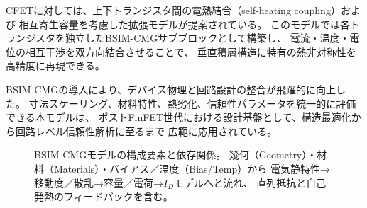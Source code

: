 CFETに対しては、上下トランジスタ間の電熱結合（self-heating coupling）および  
相互寄生容量を考慮した拡張モデルが提案されている。  
このモデルでは各トランジスタを独立したBSIM-CMGサブブロックとして構築し、  
電流・温度・電位の相互干渉を双方向結合させることで、  
垂直積層構造に特有の熱非対称性を高精度に再現できる。

BSIM-CMGの導入により、デバイス物理と回路設計の整合が飛躍的に向上した。  
寸法スケーリング、材料特性、熱劣化、信頼性パラメータを統一的に評価できる本モデルは、  
ポストFinFET世代における設計基盤として、構造最適化から回路レベル信頼性解析に至るまで  
広範に応用されている。  

\begin{figure*}[!t]
  \centering
  \resizebox{\textwidth}{!}{}
  \caption{BSIM-CMGモデルの構成要素と依存関係。
  幾何（Geometry）・材料（Materials）・バイアス／温度（Bias/Temp）から
  電気静特性→移動度／散乱→容量／電荷→$I_D$モデルへと流れ、
  直列抵抗と自己発熱のフィードバックを含む。}
  \label{fig:bsim_cmg_model}
\end{figure*}

